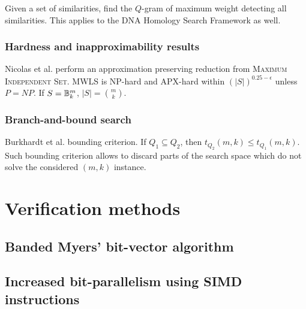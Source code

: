 Given a set of similarities, find the $Q$-gram of maximum weight detecting all similarities.
This applies to the DNA Homology Search Framework as well.

\subsubsection{Hardness and inapproximability results}

Nicolas et al. \citep{Nicolas2005} perform an approximation preserving reduction from \textsc{Maximum Independent Set}.
MWLS is NP-hard and APX-hard within $(|S|)^{0.25 - \epsilon}$ unless $P = NP$.
If $S = \mathbb {B}^{m}_{k}$, $|S| = \binom{m}{k}$.

\subsubsection{Branch-and-bound search}

Burkhardt et al. \citep{Burkhardt2001} bounding criterion. If $Q_1 \subseteq Q_2$, then $t_{Q_2}(m,k) \leq t_{Q_1}(m,k)$.
Such bounding criterion allows to discard parts of the search space which do not solve the considered $(m,k)$ instance.


\section{Verification methods}
\label{sec:verification}
\subsection{Banded Myers' bit-vector algorithm}
\subsection{Increased bit-parallelism using SIMD instructions}
